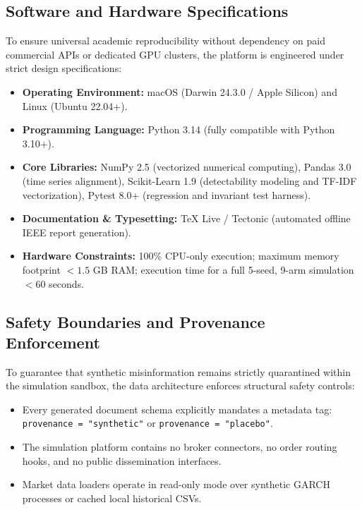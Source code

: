 \documentclass[11pt,a4paper]{article}
\begin{document}
\subsection{Software and Hardware Specifications}
To ensure universal academic reproducibility without dependency on paid commercial APIs or dedicated GPU clusters, the platform is engineered under strict design specifications:
\begin{itemize}
    \item \textbf{Operating Environment:} macOS (Darwin 24.3.0 / Apple Silicon) and Linux (Ubuntu 22.04+).
    \item \textbf{Programming Language:} Python 3.14 (fully compatible with Python 3.10+).
    \item \textbf{Core Libraries:} NumPy 2.5 (vectorized numerical computing), Pandas 3.0 (time series alignment), Scikit-Learn 1.9 (detectability modeling and TF-IDF vectorization), Pytest 8.0+ (regression and invariant test harness).
    \item \textbf{Documentation \& Typesetting:} TeX Live / Tectonic (automated offline IEEE report generation).
    \item \textbf{Hardware Constraints:} 100\% CPU-only execution; maximum memory footprint $< 1.5$ GB RAM; execution time for a full 5-seed, 9-arm simulation $< 60$ seconds.
\end{itemize}

\subsection{Safety Boundaries and Provenance Enforcement}
To guarantee that synthetic misinformation remains strictly quarantined within the simulation sandbox, the data architecture enforces structural safety controls:
\begin{itemize}
    \item Every generated document schema explicitly mandates a metadata tag: \texttt{provenance = "synthetic"} or \texttt{provenance = "placebo"}.
    \item The simulation platform contains no broker connectors, no order routing hooks, and no public dissemination interfaces.
    \item Market data loaders operate in read-only mode over synthetic GARCH processes or cached local historical CSVs.
\end{itemize}
\end{document}
